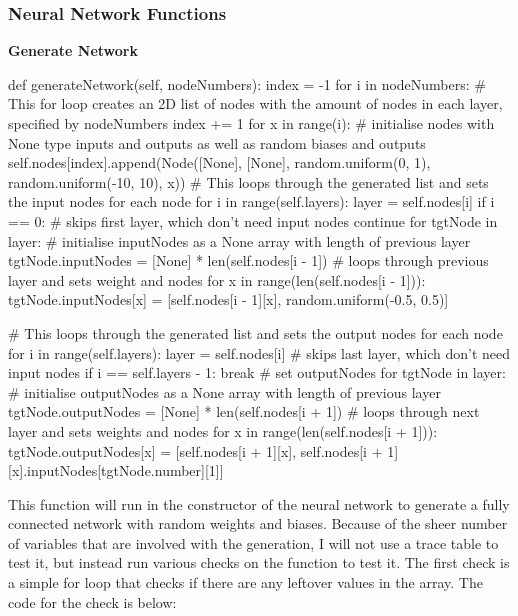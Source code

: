 \documentclass{report}
\begin{document}
\subsubsection{Neural Network Functions}
\textbf{Generate Network}
\begin{python}
def generateNetwork(self, nodeNumbers):
    index = -1
    for i in nodeNumbers: # This for loop creates an 2D list of nodes with the amount of nodes in each layer, specified by nodeNumbers
        index += 1
        for x in range(i):
            # initialise nodes with None type inputs and outputs as well as random biases and outputs
            self.nodes[index].append(Node([None], [None], 
                random.uniform(0, 1), random.uniform(-10, 10), x))
    # This loops through the generated list and sets the input nodes for each node
    for i in range(self.layers):
        layer = self.nodes[i]
        if i == 0: # skips first layer, which don't need input nodes
            continue
        for tgtNode in layer:
            # initialise inputNodes as a None array with length of previous layer
            tgtNode.inputNodes = [None] * len(self.nodes[i - 1])
            # loops through previous layer and sets weight and nodes
            for x in range(len(self.nodes[i - 1])):
                tgtNode.inputNodes[x] = [self.nodes[i - 1][x], random.uniform(-0.5, 0.5)]

    # This loops through the generated list and sets the output nodes for each node
    for i in range(self.layers):
        layer = self.nodes[i]
        # skips last layer, which don't need input nodes
        if i == self.layers - 1:
            break
        # set outputNodes
        for tgtNode in layer:
            # initialise outputNodes as a None array with length of previous layer
            tgtNode.outputNodes = [None] * len(self.nodes[i + 1])
            # loops through next layer and sets weights and nodes
            for x in range(len(self.nodes[i + 1])):
                tgtNode.outputNodes[x] = [self.nodes[i + 1][x], self.nodes[i + 1][x].inputNodes[tgtNode.number][1]]
\end{python}
This function will run in the constructor of the neural network to generate a fully connected network with random weights and biases. Because of the sheer number of variables that are involved with the generation, I will not use a trace table to test it, but instead run various checks on the function to test it.
\newline
The first check is a simple for loop that checks if there are any leftover  values in the array. The code  for the check is below:
\end{document}
